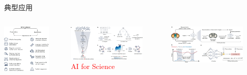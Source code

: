 \begin{frame}{典型应用}
  \begin{columns}
    \centering
    \includegraphics[width=0.8\textwidth]{Figures/AI_for_Science-1.jpeg}

    \centering
    \includegraphics[width=0.8\textwidth]{Figures/AI_for_Science-3.jpeg}\\
    \textcolor{red}{\textrm{AI for Science}}

    \centering
    \includegraphics[width=0.8\textwidth]{Figures/AI_for_Science-4.jpeg}
  \end{columns}
\end{frame}

